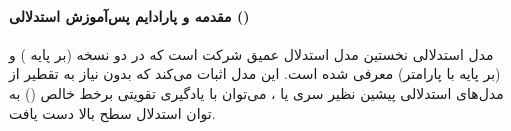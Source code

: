 \item {}


\paragraph*{مقدمه و پارادایم پس‌آموزش استدلالی ()}
مدل استدلالی  \cite{magistral2025} نخستین مدل استدلال عمیق شرکت  است که در دو نسخه  (بر پایه  \cite{mistralmedium3}) و  (بر پایه  با  پارامتر) معرفی شده است. این مدل اثبات می‌کند که بدون نیاز به تقطیر از مدل‌های استدلالی پیشین نظیر سری  \cite{jaech2024o1} یا  \cite{deepseek2025r1}، می‌توان با یادگیری تقویتی برخط خالص () به توان استدلال سطح بالا دست یافت.

